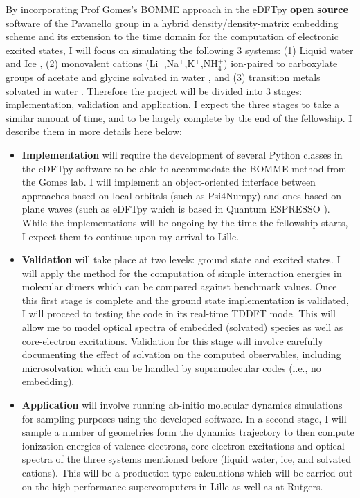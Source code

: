 \documentclass[notitlepage,12pt]{report}
\begin{document}
    By incorporating Prof Gomes's BOMME approach in the eDFTpy\supercite{edftpy} {\bf open source} software of the Pavanello group in a hybrid density/density-matrix embedding scheme and its extension to the time domain for the computation of electronic excited states, I will focus on simulating the following 3 systems: (1) Liquid water\supercite{gaiduk2018electron} and Ice \supercite{bergmann2007nearest,zhovtobriukh2019x}, (2) monovalent cations (Li$^{+}$,Na$^{+}$,K$^{+}$,NH$_4^{+}$) ion-paired to carboxylate groups of acetate and glycine solvated in water \supercite{aziz2008cation}, and (3) transition metals solvated in water \supercite{N_slund_2003,zheng2018enabling}. Therefore the project will be divided into 3 stages: implementation, validation and application. I expect the three stages to take a similar amount of time, and to be largely complete by the end of the fellowship. I describe them in more details here below:
    \begin{itemize}
        \item {\bf Implementation} will require the development of several Python classes in the eDFTpy software to be able to accommodate the BOMME method from the Gomes lab. I will implement an object-oriented interface between approaches based on local orbitals (such as Psi4Numpy)  and ones based on plane waves (such as eDFTpy\supercite{edftpy} which is based in Quantum ESPRESSO \supercite{qe}). While the implementations will be ongoing by the time the fellowship starts, I expect them to continue upon my arrival to Lille.
        \item {\bf Validation} will take place at two levels: ground state and excited states. I will apply the method for the computation of simple interaction energies in molecular dimers which can be compared against benchmark values. Once this first stage is complete and the ground state implementation is validated, I will proceed to testing the code in its real-time TDDFT mode. This will allow me to model optical spectra of embedded (solvated) species as well as core-electron excitations. Validation for this stage will involve carefully documenting the effect of solvation on the computed  observables, including microsolvation which can be handled by supramolecular codes (i.e., no embedding).
        \item {\bf Application} will involve running ab-initio molecular dynamics simulations for sampling purposes using the developed software. In a second stage, I will sample a number of geometries form the dynamics trajectory to then compute ionization energies of valence electrons, core-electron excitations and optical spectra of the three systems mentioned before (liquid water, ice, and solvated cations). This will be a production-type calculations which will be carried out on the high-performance supercomputers in Lille as well as at Rutgers. 
    \end{itemize}
\end{document}
